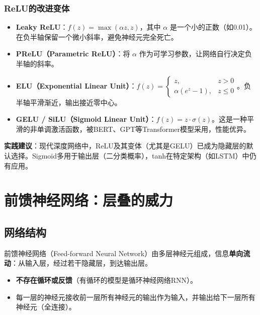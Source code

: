 \subsubsection{ReLU的改进变体}
\begin{itemize}
    \item \textbf{Leaky ReLU}：$f(z) = \max(\alpha z, z)$，其中 $\alpha$ 是一个小的正数（如0.01）。在负半轴保留一个微小斜率，避免神经元完全死亡。
    \item \textbf{PReLU（Parametric ReLU）}：将 $\alpha$ 作为可学习参数，让网络自行决定负半轴的斜率。
    \item \textbf{ELU（Exponential Linear Unit）}：$f(z) = \begin{cases} z, & z>0 \\ \alpha(e^z-1), & z \leq 0 \end{cases}$。负半轴平滑渐近，输出接近零中心。
    \item \textbf{GELU / SiLU（Sigmoid Linear Unit）}：$f(z) = z \cdot \sigma(z)$。这是一种平滑的非单调激活函数，被BERT、GPT等Transformer模型采用，性能优异。
\end{itemize}

\textbf{实践建议}：现代深度网络中，ReLU及其变体（尤其是GELU）已成为隐藏层的默认选择。Sigmoid多用于输出层（二分类概率），tanh在特定架构（如LSTM）中仍有应用。

\section{前馈神经网络：层叠的威力}

\subsection{网络结构}
前馈神经网络（Feed-forward Neural Network）由多层神经元组成，信息\textbf{单向流动}：从输入层，经过若干隐藏层，到达输出层。
\begin{itemize}
    \item \textbf{不存在循环或反馈}（有循环的模型是循环神经网络RNN）。
    \item 每一层的神经元接收前一层所有神经元的输出作为输入，并输出给下一层所有神经元（全连接）。
\end{itemize}

